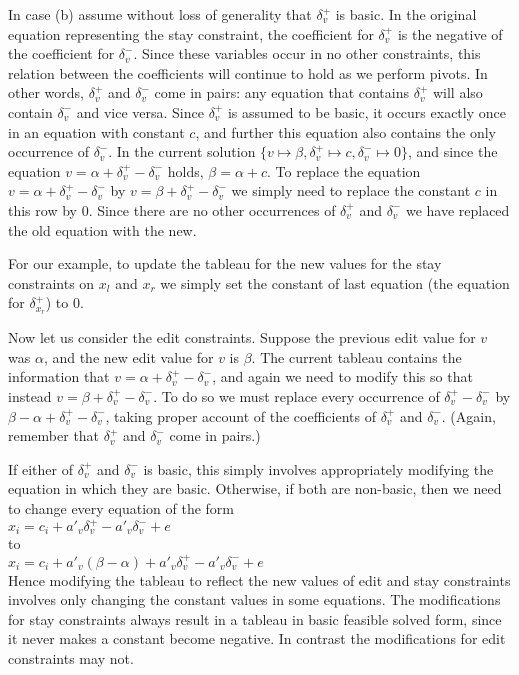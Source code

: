 \documentclass{uist96}
\begin{document}
In case (b) assume without loss of generality that $\delta_v^+$ is
basic.  In the original equation representing the stay constraint, the
coefficient for $\delta_v^+$ is the negative of the coefficient for
$\delta_v^-$\@.  Since these variables occur in no other constraints, this
relation between the coefficients will continue to hold as we perform
pivots.  In other words, $\delta_v^+$ and $\delta_v^-$ come in pairs: any
equation that contains $\delta_v^+$ will also contain $\delta_v^-$ and vice
versa.  Since $\delta_v^+$ is assumed to be basic, it occurs exactly once
in an equation with constant $c$, and further this equation also contains
the only occurrence of $\delta_v^-$\@.  In the current solution $\{v \mapsto
\beta, \delta_v^+ \mapsto c, \delta_v^- \mapsto 0\}$, and since the
equation $v = \alpha + \delta_v^+ - \delta_v^-$ holds, $\beta = \alpha +
c$\@.  To replace the equation $v = \alpha + \delta_v^+ - \delta_v^-$ by $v =
\beta + \delta_v^+ - \delta_v^-$ we simply need to replace the constant $c$
in this row by $0$\@.  Since there are no other occurrences of $\delta_v^+$
and $\delta_v^-$ we have replaced the old equation with the new.

For our example, to update the tableau for the new values for the stay
constraints on $x_l$ and $x_r$ we simply set the constant of last equation
(the equation for $\delta_{x_r}^+$) to 0.

Now let us consider the edit constraints.  Suppose the previous edit value
for $v$ was $\alpha$, and the new edit value for $v$ is $\beta$\@.  The
current tableau contains the information that \linebreak
$v = \alpha + \delta_v^+ - \delta_v^-$, 
and again we need to modify this so that instead $v = \beta +
\delta_v^+ - \delta_v^-$\@.  To do so we must replace every occurrence of
$\delta_v^+ - \delta_v^-$ by $\beta - \alpha + \delta_v^+ - \delta_v^-$,
taking proper account of the coefficients of $\delta_v^+$ and $\delta_v^-$\@.
(Again, remember that $\delta_v^+$ and $\delta_v^-$ come in pairs.)

If either of $\delta_v^+$ and $\delta_v^-$ is basic, this simply involves
appropriately modifying the equation in which they are basic.  Otherwise, if
both are non-basic, then we need to change every equation of the form \\
\hspace*{5mm}$x_i = c_i + a'_v \delta_v^+ - a'_v \delta_v^- + e$ \\
to \\
\hspace*{5mm}
$x_i = c_i + a'_v (\beta - \alpha) + a'_v \delta_v^+ - a'_v \delta_v^- + e$ \\
Hence modifying the tableau to reflect the new values of edit and stay
constraints involves only changing the constant values in some equations.
The modifications for stay constraints always result in a tableau in basic
feasible solved form, since it never makes a constant become negative.
In contrast the modifications for edit constraints may not.
\end{document}
